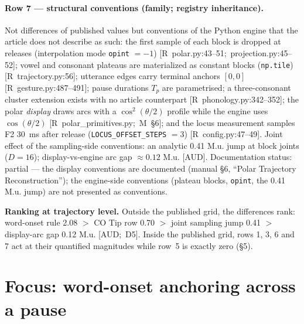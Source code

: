 \documentclass[11pt,letterpaper]{article}
\newcommand{\code}[1]{\texttt{#1}}
\newcommand{\Mua}{M.u.}
\begin{document}
\paragraph{Row 7 --- structural conventions (family; registry inheritance).}
Not differences of published values but conventions of the Python engine that
the article does not describe as such: the first sample of each block is
dropped at releases (interpolation mode \code{opint} $=-1$)
\hbox{[R polar.py:43--51; projection.py:45--52]}; vowel and consonant
plateaus are materialized as constant blocks (\code{np.tile})
\hbox{[R trajectory.py:56]}; utterance edges carry terminal anchors $[0,0]$
\hbox{[R gesture.py:487--491]}; pause durations $T_p$ are parametrised; a
three-consonant cluster extension exists with no article counterpart
\hbox{[R phonology.py:342--352]}; the polar \emph{display} draws arcs with a
$\cos^2(\theta/2)$ profile while the engine uses $\cos(\theta/2)$
\hbox{[R polar\_primitives.py; M \S6]}; and the locus measurement samples F2
30~ms after release (\code{LOCUS\_OFFSET\_STEPS} $=3$)
\hbox{[R config.py:47--49]}. Joint effect of the sampling-side conventions:
an analytic 0.41 \Mua{} jump at block joints ($D=16$); display-vs-engine arc
gap $\approx 0.12$ \Mua{} \hbox{[AUD]}. Documentation status: partial --- the
display conventions are documented (manual \S6, ``Polar Trajectory
Reconstruction''); the engine-side conventions (plateau blocks, \code{opint},
the 0.41 \Mua{} jump) are not presented as conventions.

\medskip
\noindent\textbf{Ranking at trajectory level.} Outside the published grid,
the differences rank: word-onset rule 2.08 $>$ CO Tip row 0.70 $>$ joint
sampling jump 0.41 $>$ display-arc gap 0.12 \Mua{} \hbox{[AUD; D5]}. Inside
the published grid, rows 1, 3, 6 and 7 act at their quantified magnitudes
while row~5 is exactly zero (\S5).

\section{Focus: word-onset anchoring across a pause}
\end{document}
